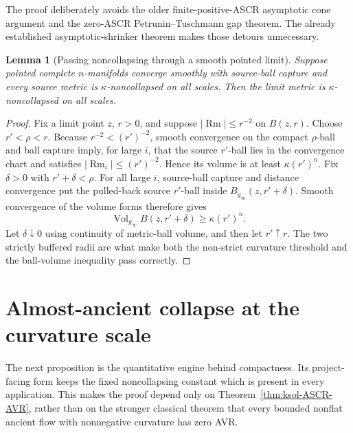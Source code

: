 \documentclass[10pt]{coll-l}
\newtheorem{lemma}[theorem]{Lemma}
\theoremstyle{definition}
\theoremstyle{remark}
\numberwithin{section}{chapter}
\numberwithin{equation}{chapter}
\newcommand{\Rm}{\operatorname{Rm}}
\newcommand{\Vol}{\operatorname{Vol}}
\begin{document}
The proof deliberately avoids the older finite-positive-ASCR asymptotic
cone argument and the zero-ASCR Petrunin--Tuschmann gap theorem.  The
already established asymptotic-shrinker theorem makes those detours
unnecessary.

\begin{lemma}[Passing noncollapsing through a smooth pointed limit]
\label{lem:ksol-pass-noncollapse}
Suppose pointed complete $n$-manifolds converge smoothly with source-ball
capture and every source metric is $\kappa$-noncollapsed on all scales.
Then the limit metric is $\kappa$-noncollapsed on all scales.
\end{lemma}

\begin{proof}
Fix a limit point $z$, $r>0$, and suppose
$|\Rm|\leq r^{-2}$ on $B(z,r)$.  Choose
$r'<\rho<r$.  Because $r^{-2}<(r')^{-2}$, smooth convergence on the
compact $\rho$-ball and ball capture imply, for large $i$, that the source
$r'$-ball lies in the convergence chart and satisfies
$|\Rm_i|\leq(r')^{-2}$.  Hence its volume is at least
$\kappa(r')^n$.  Fix $\delta>0$ with $r'+\delta<\rho$.  For all large $i$,
source-ball capture and distance convergence put the pulled-back source
$r'$-ball inside $B_{g_\infty}(z,r'+\delta)$.  Smooth convergence of the
volume forms therefore gives
\[
             \Vol_{g_\infty}B(z,r'+\delta)\geq\kappa(r')^n.
\]
Let $\delta\downarrow0$ using continuity of metric-ball volume, and then
let $r'\uparrow r$.  The two strictly buffered radii are what make both
the non-strict curvature threshold and the ball-volume inequality pass
correctly.
\end{proof}

\section{Almost-ancient collapse at the curvature scale}
\label{sec:ksol-almost-ancient}

The next proposition is the quantitative engine behind compactness.  Its
project-facing form keeps the fixed noncollapsing constant which is present
in every application.  This makes the proof depend only on
Theorem~\ref{thm:ksol-ASCR-AVR}, rather than on the stronger classical
theorem that every bounded nonflat ancient flow with nonnegative curvature
has zero AVR.
\end{document}
